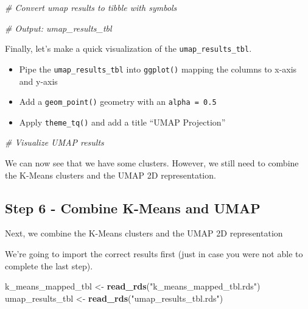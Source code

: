 \documentclass[
]{article}
\newenvironment{Shaded}{\begin{snugshade}}{\end{snugshade}}
\newcommand{\CommentTok}[1]{\textcolor[rgb]{0.56,0.35,0.01}{\textit{#1}}}
\newcommand{\KeywordTok}[1]{\textcolor[rgb]{0.13,0.29,0.53}{\textbf{#1}}}
\newcommand{\NormalTok}[1]{#1}
\newcommand{\StringTok}[1]{\textcolor[rgb]{0.31,0.60,0.02}{#1}}
\providecommand{\tightlist}{%
  \setlength{\itemsep}{0pt}\setlength{\parskip}{0pt}}
\begin{document}
\begin{Shaded}
\begin{Highlighting}[]
\CommentTok{# Convert umap results to tibble with symbols}

\CommentTok{# Output: umap_results_tbl}
\end{Highlighting}
\end{Shaded}

Finally, let's make a quick visualization of the
\texttt{umap\_results\_tbl}.

\begin{itemize}
\tightlist
\item
  Pipe the \texttt{umap\_results\_tbl} into \texttt{ggplot()} mapping
  the columns to x-axis and y-axis
\item
  Add a \texttt{geom\_point()} geometry with an \texttt{alpha\ =\ 0.5}
\item
  Apply \texttt{theme\_tq()} and add a title ``UMAP Projection''
\end{itemize}

\begin{Shaded}
\begin{Highlighting}[]
\CommentTok{# Visualize UMAP results}
\end{Highlighting}
\end{Shaded}

We can now see that we have some clusters. However, we still need to
combine the K-Means clusters and the UMAP 2D representation.

\hypertarget{step-6---combine-k-means-and-umap}{%
\subsection{Step 6 - Combine K-Means and
UMAP}\label{step-6---combine-k-means-and-umap}}

Next, we combine the K-Means clusters and the UMAP 2D representation

We're going to import the correct results first (just in case you were
not able to complete the last step).

\begin{Shaded}
\begin{Highlighting}[]
\NormalTok{k_means_mapped_tbl <-}\StringTok{ }\KeywordTok{read_rds}\NormalTok{(}\StringTok{"k_means_mapped_tbl.rds"}\NormalTok{)}
\NormalTok{umap_results_tbl   <-}\StringTok{ }\KeywordTok{read_rds}\NormalTok{(}\StringTok{"umap_results_tbl.rds"}\NormalTok{)}
\end{Highlighting}
\end{Shaded}
\end{document}
